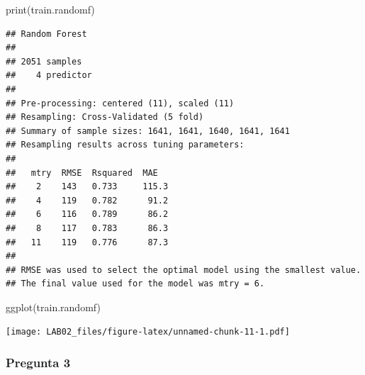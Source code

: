 \documentclass[
]{article}
\newenvironment{Shaded}{\begin{snugshade}}{\end{snugshade}}
\newcommand{\AttributeTok}[1]{\textcolor[rgb]{0.77,0.63,0.00}{#1}}
\newcommand{\FunctionTok}[1]{\textcolor[rgb]{0.00,0.00,0.00}{#1}}
\newcommand{\NormalTok}[1]{#1}
\newcommand{\OtherTok}[1]{\textcolor[rgb]{0.56,0.35,0.01}{#1}}
\newcommand{\SpecialCharTok}[1]{\textcolor[rgb]{0.00,0.00,0.00}{#1}}
\begin{document}
\begin{Shaded}
\begin{Highlighting}[]
\FunctionTok{print}\NormalTok{(train.randomf)}
\end{Highlighting}
\end{Shaded}

\begin{verbatim}
## Random Forest 
## 
## 2051 samples
##    4 predictor
## 
## Pre-processing: centered (11), scaled (11) 
## Resampling: Cross-Validated (5 fold) 
## Summary of sample sizes: 1641, 1641, 1640, 1641, 1641 
## Resampling results across tuning parameters:
## 
##   mtry  RMSE  Rsquared  MAE  
##    2    143   0.733     115.3
##    4    119   0.782      91.2
##    6    116   0.789      86.2
##    8    117   0.783      86.3
##   11    119   0.776      87.3
## 
## RMSE was used to select the optimal model using the smallest value.
## The final value used for the model was mtry = 6.
\end{verbatim}

\begin{Shaded}
\begin{Highlighting}[]
\FunctionTok{ggplot}\NormalTok{(train.randomf)}
\end{Highlighting}
\end{Shaded}

\texttt{[image: LAB02\_files/figure-latex/unnamed-chunk-11-1.pdf]}

\begin{Shaded}
\end{Shaded}

\hypertarget{pregunta-3}{%
\subsubsection{Pregunta 3}\label{pregunta-3}}
\end{document}
